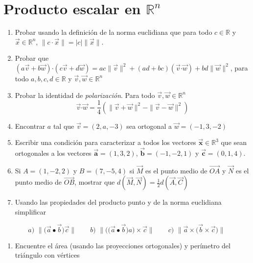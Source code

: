 \documentclass[
]{article}
\providecommand{\tightlist}{%
  \setlength{\itemsep}{0pt}\setlength{\parskip}{0pt}}
\begin{document}
\hypertarget{producto-escalar-en-mathbbrn}{%
\section{\texorpdfstring{Producto escalar en
\(\mathbb{R}^n\)}{Producto escalar en \textbackslash mathbb\{R\}\^{}n}}\label{producto-escalar-en-mathbbrn}}

\begin{enumerate}
\def\labelenumi{\arabic{enumi}.}
\item
  Probar usando la definición de la norma euclidiana que para todo
  \(c\in\mathbb{R}\) y \(\vec{x}\in \mathbb{R}^n\),
  \(\|c\cdot \vec{x}\|=|c|\|\vec{x}\|\).
\item
  Probar que
  \((a\vec{v}+b\vec{w})\boldsymbol{\cdot}(c\vec{v}+d\vec{w}) = ac\|\vec{v}\|^2 + (ad+bc)(\vec{v}\boldsymbol{\cdot}\vec{w})+bd\|\vec{w}\|^2\),
  para todo \(a,b,c,d\in \mathbb{R}\) y
  \(\vec{v},\vec{w}\in\mathbb{R}^n\)
\item
  Probar la identidad de \emph{polarización}. Para todo
  \(\vec{v},\vec{w}\in\mathbb{R}^n\) \[
  \vec{v}\boldsymbol{\cdot}\vec{w}=\frac{1}{4}(\|\vec{v}+\vec{w}\|^2-\|\vec{v}-\vec{w}\|^2)
  \]
\item
  Encontrar \(a\) tal que \(\vec{v}=(2,a,-3)\) sea ortogonal a
  \(\vec{w}=(-1,3,-2)\)
\item
  Escribir una condición para caracterizar a todos los vectores
  \(\vec{\mathbf{x}}\in\mathbb{R}^{3}\) que sean ortogonales a los
  vectores \(\vec{\mathbf{a}}=(1,3,2)\), \(\vec{\mathbf{b}}=(-1,-2,1)\)
  y \(\vec{\mathbf{c}}=(0,1,4)\).
\item
  Si \(A=(1,-2,2)\) y \(B=(7,-5,4)\) si \(\vec{M}\) es el punto medio de
  \(\vec{OA}\) y \(\vec{N}\) es el punto medio de \(\vec{OB}\), mostrar
  que \(d(\vec{M},\vec{N})=\frac{1}{2}d(\vec{A},\vec{C})\)
\item
  Usando las propiedades del producto punto y de la norma euclidiana
  simplificar
\end{enumerate}

\[
a)\,\,  \|\big(\vec{a}\bullet\vec{b}\big) \vec{c} \|
\quad\quad
b)\,\,  \|\big(\big(\vec{a}\bullet\vec{b}\big)a\big) \times \vec{c} \|
\quad\quad
c) \,\, \|\vec{a}\times \big(\vec{b} \times \vec{c}\big)\|
\]

\begin{enumerate}
\def\labelenumi{\arabic{enumi}.}
\tightlist
\item
  Encuentre el área (usando las proyecciones ortogonales) y perímetro
  del triángulo con vértices
\end{enumerate}
\end{document}
